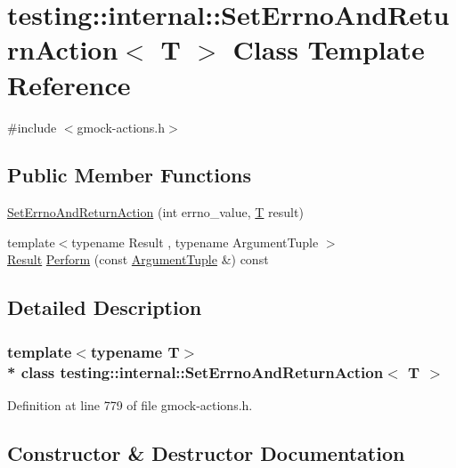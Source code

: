 \hypertarget{classtesting_1_1internal_1_1_set_errno_and_return_action}{}\section{testing\+:\+:internal\+:\+:Set\+Errno\+And\+Return\+Action$<$ T $>$ Class Template Reference}
\label{classtesting_1_1internal_1_1_set_errno_and_return_action}


{\ttfamily \#include $<$gmock-\/actions.\+h$>$}

\subsection*{Public Member Functions}
\begin{DoxyCompactItemize}
\item 
\hyperlink{classtesting_1_1internal_1_1_set_errno_and_return_action_abfe5a194a9b8f2b303c635ad99b3a257}{Set\+Errno\+And\+Return\+Action} (int errno\+\_\+value, \hyperlink{functions__7_8js_adf1f3edb9115acb0a1e04209b7a9937b}{T} result)
\item 
{\footnotesize template$<$typename Result , typename Argument\+Tuple $>$ }\\\hyperlink{typedefs__d_8js_a28287671eaf7406afd604bd055ba4066}{Result} \hyperlink{classtesting_1_1internal_1_1_set_errno_and_return_action_aced34306c80406663b57465f85ef70a9}{Perform} (const \hyperlink{typedefs__d_8js_a396b2bdc7ef45f482a7e9254b15c3c01}{Argument\+Tuple} \&) const 
\end{DoxyCompactItemize}


\subsection{Detailed Description}
\subsubsection*{template$<$typename T$>$\\*
class testing\+::internal\+::\+Set\+Errno\+And\+Return\+Action$<$ T $>$}



Definition at line 779 of file gmock-\/actions.\+h.



\subsection{Constructor \& Destructor Documentation}
